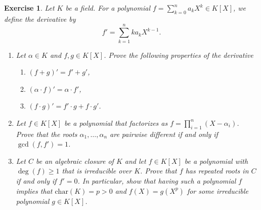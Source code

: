 \documentclass[a4paper,10pt,reqno]{amsart}
\newtheorem{ex}{Exercise}[section]
\begin{document}
\begin{ex}
    Let $K$ be a field. For a polynomial $f = \sum_{k=0}^na_kX^k \in K[X]$, we define the \emph{derivative} by
    \[
    f' = \sum_{k=1}^n ka_kX^{k-1}.
    \]
    \begin{enumerate}[label=(\roman*)]
        \item Let $\alpha \in K$ and $f,g \in K[X]$. Prove the following properties of the derivative
        \begin{enumerate}
            \item $(f + g)' = f' + g'$,
            \item $(\alpha \cdot f)' = \alpha \cdot f'$,
            \item $(f\cdot g)' = f'\cdot g + f \cdot g'$.
        \end{enumerate}
        \item Let $f \in K[X]$ be a polynomial that factorizes as $f = \prod_{i=1}^n (X - \alpha_i)$. Prove that the roots $\alpha_1, \ldots, \alpha_n$ are pairwise different if and only if $\gcd(f,f') = 1$.
        \item Let $C$ be an algebraic closure of $K$ and let $f \in K[X]$ be a polynomial with $\deg(f) \geq 1$ that is irreducible over $K$. Prove that $f$ has repeated roots in $C$ if and only if $f' = 0$.  In particular, show that 
        having such a polynomial $f$
        implies that $\mathrm{char}(K) = p > 0$ and $f(X) = g(X^p)$ for some irreducible polynomial $g \in K[X]$.
    \end{enumerate}
\end{ex}
\end{document}
